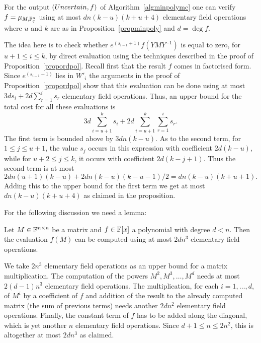 \begin{Prop}\label{eval}
%
    For the output $(\textsc{Uncertain},f)$ of Algorithm~\ref{algminpolymc} 
    one can verify $f = \mu_{M,\mathbb{F}_q^n}$ using
    at most $dn(k-u)(k+u+4)$ elementary field operations where $u$ and
    $k$ are as in Proposition~\ref{propminpoly} and $d = \deg f$.
\end{Prop}
\proofbeg
The idea here is to check whether $e^{(s_{i-1}+1)} f(YMY^{-1})$ is equal to zero, for 
$u+1 \le i \le k$,
by direct evaluation using the techniques described in
the proof of Proposition~\ref{propordpol}. Recall first that the
result $f$ comes in factorised form. Since $e^{(s_{i-1}+1)}$ lies
in $W'_i$ the arguments in the proof of Proposition~\ref{propordpol}
show that this evaluation can be done using at most
$3d s_i + 2d \sum_{r=1}^i s_r$ elementary field operations. Thus, an
upper bound for the total cost for all these evaluations is
\[ 3d \sum_{i=u+1}^k s_i + 2d \sum_{i=u+1}^k \sum_{r=1}^i s_r. \]
The first term is bounded above by $3dn(k-u)$. As to the second
term, for $1 \le j \le u+1$, the value $s_j$ occurs in this expression
with coefficient $2d(k-u)$, while for $u+2 \le j \le k$, it occurs
with coefficient $2d(k-j+1)$. Thus the second term is at most
\[ 
2dn(u+1)(k-u) + 2dn(k-u)(k-u-1)/2 = dn(k-u)(k+u+1). 
\]
Adding this to the upper bound for the first term we get at most
$dn(k-u)(k+u+4)$ as claimed in the proposition.
\proofend

\medskip
For the following discussion we need a lemma:

\begin{Lemm}
\label{costpolyeval}
Let $M \in \mathbb{F}^{n \times n}$ be a matrix and $f \in \mathbb{F}[x]$ a polynomial 
with degree $d < n$. Then the evaluation $f(M)$ can be computed using
at most $2dn^3$ elementary field operations.
\end{Lemm}

\proofbeg We take $2n^3$ elementary field operations as an upper bound for a matrix
multiplication. The computation of the powers $M^2, M^3, \ldots, M^d$
needs at most $2(d-1)n^3$ elementary field operations. The
multiplication, for each $i=1,\dots,d$, of $M^i$ by a coefficient of $f$
and addition of the result to the already computed matrix (the sum of previous terms) 
needs another $2dn^2$ elementary field operations. Finally, the
constant term of $f$ has to be added along the diagonal, which is yet
another $n$ elementary field operations. Since $d+1\le n \le 2 n^2$, 
this is altogether at most $2dn^3$
as claimed.
\proofend

